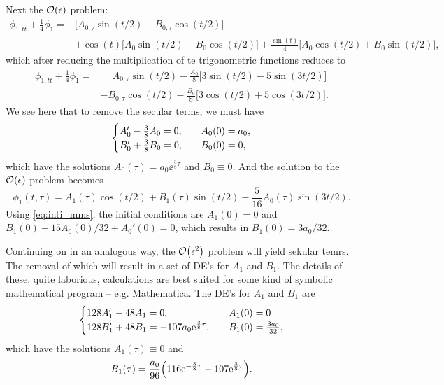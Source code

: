 \documentclass[11pt,letter, swedish, english,%
]{article}
\begin{document}
Next the $\order{\epsilon}$ problem: 
\begin{equation}
\begin{aligned}
\phi_{1, tt}+\frac{1}{4}\phi_1=&\Big[A_{0,\tau}\sin(t/2)-B_{0, \tau}\cos(t/2)\Big]\\
&+\cos(t)\Big[A_0\sin(t/2)-B_0\cos(t/2)\Big]
+\frac{\sin(t)}{4}\Big[A_0\cos(t/2)+B_0\sin(t/2)\Big],
\end{aligned}
\end{equation}
which after reducing the multiplication of te trigonometric functions
reduces to
\begin{equation}
\begin{aligned}
\phi_{1, tt}+\frac{1}{4}\phi_1=&\phantom{+}A_{0,\tau}\sin(t/2)
-\frac{A_0}{8}\Big[3\sin(t/2)-5\sin(3t/2)\Big]\\
&{-}B_{0, \tau}\cos(t/2)
-\frac{B_0}{8}\Big[3\cos(t/2)+5\cos(3t/2)\Big].
\end{aligned}
\end{equation}
We see here that to remove the secular terms, we must have
\begin{equation}
\begin{cases}
A_0'-\frac{3}{8}A_0=0\qcomma&A_0(0)=a_0,\\
B_0'+\frac{3}{8}B_0=0\qcomma&B_0(0)=0,
\end{cases}
\end{equation}
which have the solutions $A_0(\tau)=a_0\ee^{\frac{3}{8}\tau}$ and
$B_0\equiv0$. And the solution to the $\order{\epsilon}$ problem
becomes
\begin{equation}
\phi_1(t, \tau)=A_1(\tau)\cos(t/2)+B_1(\tau)\sin(t/2)
-\frac{5}{16}A_0(\tau)\sin(3t/2).
\end{equation}
Using \eqref{eq:inti_mms}, the initial conditions are $A_1(0)=0$ and
$B_1(0)-15A_0(0)/32 + A_0'(0)=0$, which results in $B_1(0)=3a_0/32$.

Continuing on in an analogous way, the $\order{\epsilon^2}$ problem
will yield sekular temrs. The removal of which will result in a set of
DE's for $A_1$ and $B_1$. The details of these, quite laborious,
calculations are best suited for some kind of symbolic mathematical
program -- e.g. Mathematica. The DE's for $A_1$ and $B_1$ are 
\begin{equation}
\begin{cases}
128A_1'-48A_1=0\qcomma&A_1(0)=0\\
128B_1'+48B_1=-107a_0\ee^{\frac{3}{8}\tau}\qcomma&B_1(0)=\frac{3a_0}{32},
\end{cases}
\end{equation}
which have the solutions $A_1(\tau)\equiv0$ and
\begin{equation}
B_1(\tau)=\frac{a_0}{96}
\qty(116\mathrm{e}^{-\frac{3}{8}\tau}-107\mathrm{e}^{\frac{3}{8}\tau}).
\end{equation}
\end{document}
